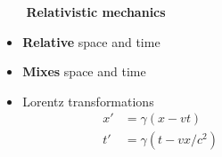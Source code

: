 \documentclass[mathserif,8pt]{beamer}
\begin{document}
\begin{frame}
\begin{columns}
\begin{column}{.40\textwidth}
    \end{column}
    \begin{column}{.30\textwidth}
    \ \ \ \ \textbf{Relativistic mechanics}
    \begin{itemize}
	\item \textbf{Relative} space and time
	\item \textbf{Mixes} space and time
	\item Lorentz transformations\\
	    \begin{align}
		\nonumber
		x' &= \gamma (x - vt)\\
		\nonumber
		t' &= \gamma (t - vx/c^2)
	    \end{align}
    \end{itemize}
    \end{column}
    \end{columns}
\end{frame}
\end{document}
